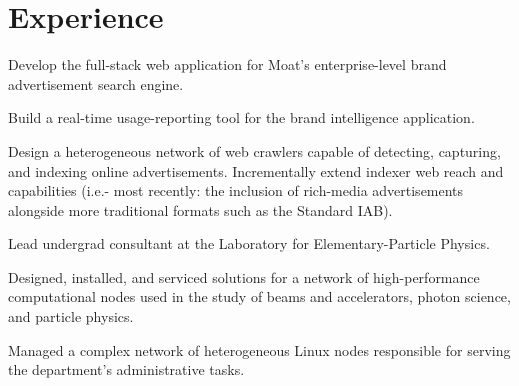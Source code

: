 \documentclass[]{deedy-resume-openfont}
\begin{document}
\hfill
\begin{minipage}[t]{0.66\textwidth} 

    \section{Experience}

        \vspace{\topsep} %
        \begin{tightemize}
            \item Develop the full-stack web application for Moat’s enterprise-level brand advertisement search engine.
            \item Build a real-time usage-reporting tool for the brand intelligence application.
            \item Design a heterogeneous network of web crawlers capable of detecting, capturing, and indexing online advertisements. Incrementally extend indexer web reach and capabilities (i.e.- most recently: the inclusion of rich-media advertisements alongside more traditional formats such as the Standard IAB). 
        \end{tightemize}
    \sectionsep

        \begin{tightemize}
            \item Lead undergrad consultant at the Laboratory for
                  Elementary-Particle Physics.
            \item Designed, installed, and serviced solutions for a network of
                  high-performance computational nodes used in the study of
                  beams and accelerators, photon science, and particle physics.
            \item Managed a complex network of heterogeneous Linux nodes
                  responsible for serving the department’s administrative
                  tasks.
        \end{tightemize}
    \sectionsep


\end{minipage}
\end{document}
